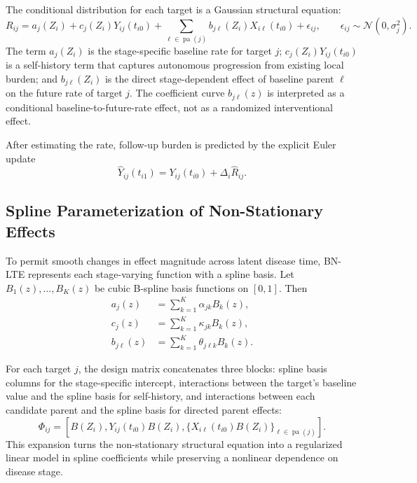 The conditional distribution for each target is a Gaussian structural equation:
\begin{equation}
R_{ij}
=
a_j(Z_i)
+ c_j(Z_i)Y_{ij}(t_{i0})
+ \sum_{\ell \in \operatorname{pa}(j)}
b_{j\ell}(Z_i)X_{i\ell}(t_{i0})
+ \epsilon_{ij},
\qquad
\epsilon_{ij}\sim\mathcal{N}(0,\sigma_j^2).
\label{eq:bnlte_scm}
\end{equation}
The term $a_j(Z_i)$ is the stage-specific baseline rate for target $j$;
$c_j(Z_i)Y_{ij}(t_{i0})$ is a self-history term that captures autonomous
progression from existing local burden; and $b_{j\ell}(Z_i)$ is the direct
stage-dependent effect of baseline parent $\ell$ on the future rate of target
$j$. The coefficient curve $b_{j\ell}(z)$ is interpreted as a conditional
baseline-to-future-rate effect, not as a randomized interventional effect.

After estimating the rate, follow-up burden is predicted by the explicit Euler
update
\begin{equation}
\widehat{Y}_{ij}(t_{i1})
=
Y_{ij}(t_{i0}) + \Delta_i \widehat{R}_{ij}.
\label{eq:bnlte_euler}
\end{equation}

\subsection{Spline Parameterization of Non-Stationary Effects}

To permit smooth changes in effect magnitude across latent disease time, BN-LTE
represents each stage-varying function with a spline basis. Let
$B_1(z),\ldots,B_K(z)$ be cubic B-spline basis functions on $[0,1]$. Then
\begin{align}
a_j(z)
&=
\sum_{k=1}^{K}\alpha_{jk}B_k(z),
\\
c_j(z)
&=
\sum_{k=1}^{K}\kappa_{jk}B_k(z),
\\
b_{j\ell}(z)
&=
\sum_{k=1}^{K}\theta_{j\ell k}B_k(z).
\end{align}

For each target $j$, the design matrix concatenates three blocks: spline basis
columns for the stage-specific intercept, interactions between the target's
baseline value and the spline basis for self-history, and interactions between
each candidate parent and the spline basis for directed parent effects:
\begin{equation}
\Phi_{ij}
=
\left[
B(Z_i),
Y_{ij}(t_{i0})B(Z_i),
\{X_{i\ell}(t_{i0})B(Z_i)\}_{\ell \in \operatorname{pa}(j)}
\right].
\label{eq:bnlte_design}
\end{equation}
This expansion turns the non-stationary structural equation into a regularized
linear model in spline coefficients while preserving a nonlinear dependence on
disease stage.

